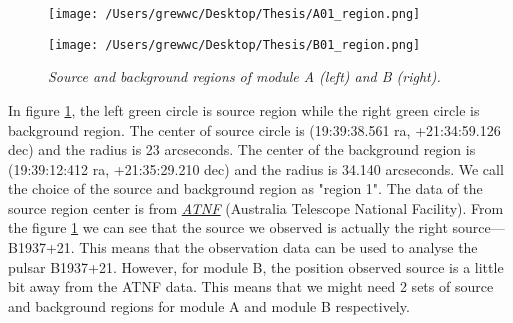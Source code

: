\documentclass[12pt]{report}
\newcommand{\mycaption}[1]{\caption{\textit{\footnotesize #1}}}
\begin{document}
        \begin{figure}[h]
          \begin{minipage}{0.45\textwidth} 
            \begin{flushright} 
            \texttt{[image: /Users/grewwc/Desktop/Thesis/A01\_region.png]}
            \end{flushright}
          \end{minipage}
          \hspace{2.1cm}  
          \begin{minipage}{0.45\textwidth}
            \begin{flushleft}
            \texttt{[image: /Users/grewwc/Desktop/Thesis/B01\_region.png]}
            \end{flushleft}
          \end{minipage}
          \begin{center}
          \begin{minipage}{0.85\textwidth}
            \vspace{0.25cm}
            \mycaption{Source and background regions of module A (left) and B (right).}
            \label{fig:sky0}
          \end{minipage}
        \end{center}
        \end{figure}
        \indent In figure \ref{fig:sky0}, the left green circle is source region while the right green 
        circle is 
        background region. The center of source circle is (19:39:38.561 ra, +21:34:59.126 dec) and the radius is 
        23 arcseconds. The center of the background region is (19:39:12:412 ra, +21:35:29.210 dec) and the radius is 
        34.140 arcseconds. We call the choice of the source and background region as "region 1".
        The data of the source region center is from
        \href{http://www.atnf.csiro.au/people/pulsar/psrcat/proc\_form.php?version=1.56&startUserDefined=true&c1\_val%
        =&c2\_val=&c3\_val=&c4\_val=&sort\_attr=jname&sort\_order=asc&condition=&pulsar\_names=b1937\%2B21\%0D\%0A&ep%
        hemeris=short&submit\_ephemeris=Get+Ephemeris&coords\_unit=raj\%2Fdecj&radius=&coords\_1=&coords\_2=&style=%
        Long+with+last+digit+error&no\_value=*&fsize=3&x\_axis=&x\_scale=linear&y\_axis=&y\_scale=linear&state=query}%
        {\textit{ATNF}}
        (Australia Telescope National Facility). From the figure \ref{fig:sky0} we can see that the source we 
        observed is actually the right source---B1937+21. This means that the observation data can be used to analyse 
        the pulsar B1937+21. However, for module B, the position observed source is a little bit away from the 
        ATNF data. This means that we might need 2 sets of source and background regions for module A and module B
        respectively.
\end{document}
